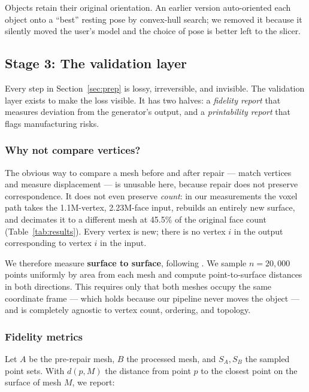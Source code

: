 \documentclass[11pt,a4paper]{article}
\begin{document}
Objects retain their original orientation. An earlier version auto-oriented
each object onto a ``best'' resting pose by convex-hull search; we removed it
because it silently moved the user's model and the choice of pose is better
left to the slicer.

\subsection{Stage 3: The validation layer}
\label{sec:validation}

Every step in Section~\ref{sec:prep} is lossy, irreversible, and invisible. The
validation layer exists to make the loss visible. It has two halves: a
\emph{fidelity report} that measures deviation from the generator's output, and
a \emph{printability report} that flags manufacturing risks.

\subsubsection{Why not compare vertices?}

The obvious way to compare a mesh before and after repair --- match vertices
and measure displacement --- is unusable here, because repair does not preserve
correspondence. It does not even preserve \emph{count}: in our measurements the
voxel path takes the 1.1M-vertex, 2.23M-face input, rebuilds an entirely new
surface, and decimates it to a different mesh at 45.5\% of the original face
count (Table~\ref{tab:results}). Every vertex is new; there is no vertex $i$ in
the output corresponding to vertex $i$ in the input.

We therefore measure \textbf{surface to surface}, following
\cite{aspert2002mesh}. We sample $n = 20{,}000$ points uniformly by area from
each mesh and compute point-to-surface distances in both directions. This
requires only that both meshes occupy the same coordinate frame --- which holds
because our pipeline never moves the object --- and is completely agnostic to
vertex count, ordering, and topology.

\subsubsection{Fidelity metrics}

Let $A$ be the pre-repair mesh, $B$ the processed mesh, and $S_A, S_B$ the
sampled point sets. With $d(p, M)$ the distance from point $p$ to the closest
point on the surface of mesh $M$, we report:
\end{document}
